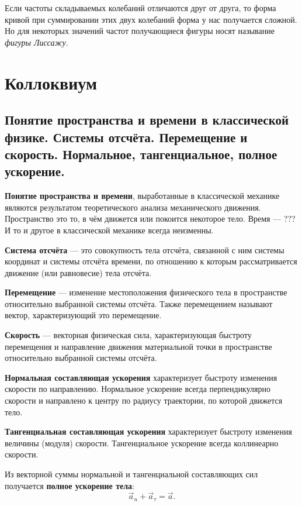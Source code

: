 \documentclass[10pt]{scrbook}
\begin{document}

Если частоты складываемых колебаний отличаются друг от друга, то форма кривой
при суммировании этих двух колебаний форма у нас получается сложной. Но для
некоторых значений частот получающиеся фигуры носят называние \emph{фигуры
	Лиссажу}.

\backmatter
\appendix
\chapter{Коллоквиум}

\section[первый вопрос]{Понятие пространства и времени в классической физике. Системы отсчёта.
  Перемещение и скорость. Нормальное, тангенциальное, полное ускорение.}

\textbf{Понятие пространства и времени}, выработанные в классической механике
являются результатом теоретического анализа механического движения.
Пространство это то, в чём движется или покоится некоторое тело. Время --- ???
И то и другое в классической механике всегда неизменны.

\textbf{Система отсчёта} --- это совокупность тела отсчёта, связанной с ним
системы координат и системы отсчёта времени, по отношению к которым
рассматривается движение (или равновесие) тела отсчёта.

\textbf{Перемещение} --- изменение местоположения физического тела в
пространстве относительно выбранной системы отсчёта. Также перемещением
называют вектор, характеризующий это перемещение.

\textbf{Скорость} --- векторная физическая сила, характеризующая быстроту
перемещения и направление движения материальной точки в пространстве
относительно выбранной системы отсчёта.

\textbf{Нормальная составляющая ускорения} характеризует быстроту изменения
скорости по направлению. Нормальное ускорение всегда перпендикулярно скорости и
направлено к центру по радиусу траектории, по которой движется тело.

\textbf{Тангенциальная составляющая ускорения} характеризует быстроту изменения
величины (модуля) скорости. Тангенциальное ускорение всегда коллинеарно
скорости.

Из векторной суммы нормальной и тангенциальной составляющих сил получается
\textbf{полное ускорение тела}: \[
	\vec{a}_n + \vec{a}_\tau = \vec{a}
	.\]
\end{document}
